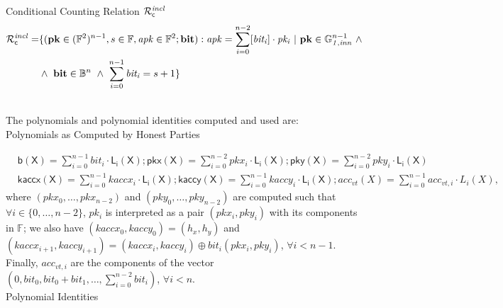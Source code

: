 \noindent \textsf{Conditional Counting Relation $\mathcal{R}^{\mathit{incl}}_{\mathsf{c}}$}  
\begin{equation*}
\begin{split}
 \Rvt = & \{(\mathbf{pk} \in (\mathbb{F}^2)^{n-1}, s \in \mathbb{F}, \mathit{apk} \in \mathbb{F}^2; \mathbf{bit}) : 
 \mathit{apk} = \sum_{i=0}^{n-2} [\mathit{bit_i}]  \cdot \mathit{pk_i} \ | \ \mathbf{pk}  \in \ginn{1}^{n-1} \ \wedge \\ 
& \wedge \ \mathbf{bit} \in \mathbb{B}^n \ \wedge \ \sum_{i=0}^{n-1} \mathit{bit_i} = s+1\} 
\end{split}
\end{equation*}

\\
\noindent The polynomials and polynomial identities computed and used are: \\

\noindent \textsf{Polynomials as Computed by Honest Parties} 

\begin{align*}
&\mathsf{b(X)} = \sum_{i=0}^{n-1} \mathit{bit_i} \cdot \mathsf{L_i(X)}; \mathsf{pkx(X)} =  \sum_{i=0}^{n-2} \mathit{pkx_i} \cdot \mathsf{L_i(X)}; 
\mathsf{pky(X)} =  \sum_{i=0}^{n-2} \mathit{pky_i} \cdot \mathsf{L_i(X)} \\
&\mathsf{kaccx(X)}  =  \sum_{i=0}^{n-1} \mathit{kaccx_i} \cdot \mathsf{L_i(X)}; \mathsf{kaccy(X)}  = \sum_{i=0}^{n-1} \mathit{kaccy_i} \cdot \mathsf{L_i(X)}; 
acc_{vt}(X)  = \sum_{i=0}^{n-1} acc_{vt,i} \cdot L_i(X),
\end{align*}
\noindent where $(\mathit{pkx_0}, \ldots, \mathit{pkx_{n-2}})$ 
and $(\mathit{pky_0}, \ldots, \mathit{pky_{n-2}})$ are computed such that $\forall i \in \{0, \ldots, n-2\}$, $\mathit{pk_i}$ 
is interpreted as a pair $(\mathit{pkx_i}, \mathit{pky_i})$ with its components in $\mathbb{F}$; we also have 
$(\mathit{kaccx_{0}}, \mathit{kaccy_{0}}) = (\mathit{h_x}, \mathit{h_y})$ and 
$(\mathit{kaccx_{i+1}}, \mathit{kaccy_{i+1}}) =  (\mathit{kaccx_{i}}, \mathit{kaccy_{i}}) \oplus \mathit{bit_i}(\mathit{pkx_{i}}, \mathit{pky_{i}})$, 
$\forall i < n-1$. Finally, $acc_{vt,i}$ are the components of the vector 
$(0, \mathit{bit_0}, \mathit{bit_0} + \mathit{bit_1}, \ldots, \sum_{i=0}^{n-2}\mathit{bit_i})$, $\forall i < n$. \\

\noindent \textsf{Polynomial Identities} 

